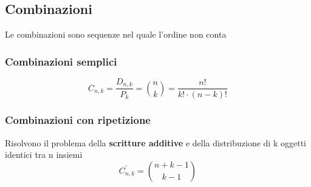 \documentclass{report}
\begin{document}
    \subsection{Combinazioni}
    Le combinazioni sono sequenze nel quale l'ordine non conta
        \subsubsection{Combinazioni semplici}
            $$C_{n,k} = \frac{D_{n,k}}{P_k} = \binom{n}{k} = \frac{n!}{k! \cdot (n-k)!}$$
        \subsubsection{Combinazioni con ripetizione}
            Risolvono il problema della \textbf{scritture additive} e della distribuzione
            di k oggetti identici tra n insiemi
            $$C_{n,k}^{'} = \binom{n + k - 1}{k-1}$$
\end{document}
